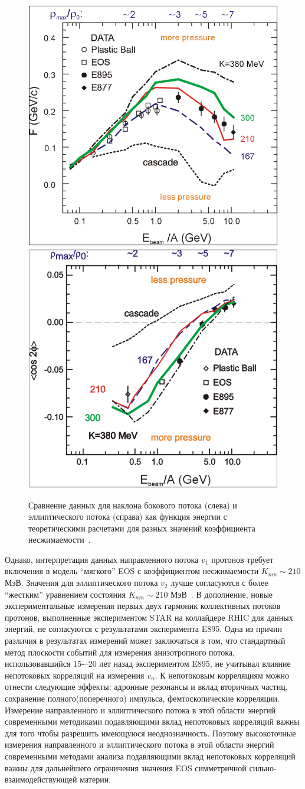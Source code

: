 \begin{figure}
    \centering
    \includegraphics[width=0.45\linewidth]{images/Danilewicz_F_energy.png}
    \includegraphics[width=0.45\linewidth]{images/Danilewicz_Elliptic_energy.png}
    \caption{Сравнение данных для наклона бокового потока (слева) и эллиптического потока (справа) как функция энергии с теоретическими расчетами для разных значений коэффициента несжимаемости~\cite{Danielewicz:2002pu}.}
    \label{fig:Danilewicz}
\end{figure}
Однако, интерпретация данных направленного потока $v_1$ протонов требует включения в модель ``мягкого'' EOS с коэффициентом несжимаемости $K_{nm} \sim 210$ МэВ. 
Значения  для эллиптического потока $v_2$ лучше согласуются с более ``жестким'' уравнением состояния $K_{nm} \sim 210$ МэВ~\cite{Danielewicz:2002pu}. 
В дополнение, новые экспериментальные измерения первых двух гармоник коллективных потоков протонов, выполненные экспериментом  STAR на коллайдере RHIC для данных энергий, не согласуются с результатами эксперимента E895.
Одна из причин различия в результатах измерений может заключаться в том, что стандартный метод плоскости событий для измерения анизотропного потока, использовавшийся 15-–20 лет назад экспериментом E895, не учитывал влияние непотоковых корреляций  на измерения $v_n$. 
К непотоковым корреляциям можно отнести следующие эффекты: адронные резонансы и вклад вторичных частиц, сохранение полного(поперечного) импульса, фемтоскопические корреляции. 
Измерение направленного и эллиптического потока в этой области энергий современными методиками подавляющими вклад непотоковых корреляций важны для того чтобы разрешить имеющуюся неоднозначность.
Поэтому высокоточные измерения направленного и эллиптического потока в этой области энергий современными методами анализа подавляющими вклад непотоковых корреляций важны для дальнейшего ограничения значения EOS симметричной сильно-взаимодействующей материи.

